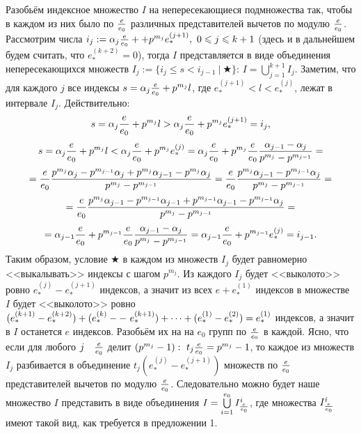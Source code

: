 \documentclass[a4paper]{article}
\newcommand{\Leq}{\leqslant}
\begin{document}
Разобьём индексное множество $I$ на непересекающиеся подмножества так, чтобы в каждом из них было по $e\over e_0$ различных представителей вычетов по модулю $e\over e_0$. Рассмотрим числа $i_j:=\alpha_j{e\over e_0}+\linebreak+p^{m_j}e_*^{(j+1)},\ 0\Leq j\Leq k+1$ (здесь и в дальнейшем будем считать, что $e_*^{(k+2)}=0$), тогда $I$ представляется в виде объединения непересекающихся множеств $I_j:=\{i_j\Leq s<i_{j-1}\ |\ \bigstar\}$: $I=\bigcup\limits_{j=1}^{k+1}I_j$. Заметим, что для каждого $j$ все индексы $s=\alpha_j{e\over e_0}+p^{m_j}l$, где $e_*^{(j+1)}<l<e_*^{(j)}$, лежат в интервале $I_j$. Действительно:
$$s=\alpha_j{e\over e_0}+p^{m_j}l>\alpha_j{e\over e_0}+p^{m_j}e_*^{(j+1)}=i_j,$$ 
$$s=\alpha_j{e\over e_0}+p^{m_j}l<\alpha_j{e\over e_0}+p^{m_j}e_*^{(j)}=\alpha_j{e\over e_0}+p^{m_j}{e\over e_0}{\alpha_{j-1}-\alpha_j\over p^{m_j}-p^{m_{j-1}}}=$$
$$={e\over e_0}{p^{m_j}\alpha_j-p^{m_{j-1}}\alpha_j+p^{m_j}\alpha_{j-1}-p^{m_j}\alpha_j\over p^{m_j}-p^{m_{j-1}}}={e\over e_0}{p^{m_j}\alpha_{j-1}-p^{m_{j-1}}\alpha_j\over p^{m_j}-p^{m_{j-1}}}=$$
$$={e\over e_0}{p^{m_j}\alpha_{j-1}-p^{m_{j-1}}\alpha_{j-1}+p^{m_{j-1}}\alpha_{j-1}-p^{m_{j-1}}\alpha_j\over p^{m_j}-p^{m_{j-1}}}=$$
$$=\alpha_{j-1}{e\over e_0}+p^{m_{j-1}}{e\over e_0}{\alpha_{j-1}-\alpha_j\over p^{m_j}-p^{m_{j-1}}}=\alpha_{j-1}{e\over e_0}+p^{m_{j-1}}e_*^{(j)}=i_{j-1}.$$
Таким образом, условие $\bigstar$ в каждом из множеств $I_j$ будет равномерно <<выкалывать>> индексы с шагом $p^{m_j}$. Из каждого $I_j$ будет <<выколото>> ровно $e_*^{(j)}-e_*^{(j+1)}$ индексов, а значит из всех $e+e_*^{(1)}$ индексов в множестве $I$ будет <<выколото>> ровно $(e_*^{(k+1)}-e_*^{(k+2)})+(e_*^{(k)}-\linebreak-\ e_*^{(k+1)})+\dots+(e_*^{(1)}-e_*^{(2)})=e_*^{(1)}$ индексов, а значит в $I$ останется $e$ индексов. Разобьём их на на $e_0$ групп по $e\over e_0$ в каждой.  Ясно, что если для любого $j\quad {e\over e_0}$ делит $(p^{m_j}-1):\ t_j{e\over e_0}=p^{m_j}-1$, то каждое из множеств $I_j$ разбивается в объединение $t_j(e_*^{(j)}-e_*^{(j+1)})$ множеств по $e\over e_0$ представителей вычетов по модулю $e\over e_0$.  Следовательно можно будет наше множество $I$ представить в виде объединения $I=\bigcup\limits_{i=1}^{e_0}I_{e\over e_0}^i$, где множества $I_{e\over e_0}^i$ имеют такой вид, как требуется в предложении 1.

\paragraph{}
\end{document}
